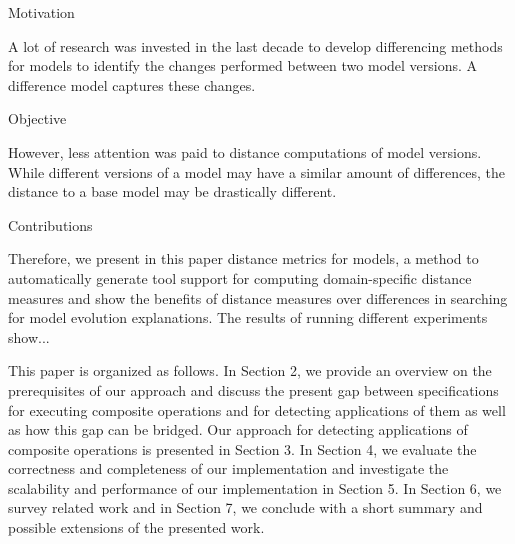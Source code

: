  
Motivation

A lot of research was invested in the last decade to develop differencing methods for models to identify the changes performed between two model versions.
A difference model captures these changes.

Objective

However, less attention was paid to distance computations of model versions. While different versions of a model may have a similar amount of differences,
the distance to a base model may be drastically different. 

Contributions

Therefore, we present in this paper distance metrics for models, a method to automatically generate tool support for computing domain-specific distance measures and show the benefits of distance measures over differences in searching for model evolution explanations. The results of running different experiments show...


This paper is organized as follows. In Section 2, we provide an overview on the prerequisites of our approach and discuss the present gap between specifications for executing composite operations and for detecting applications of them as well as how this gap can be bridged. Our approach for detecting applications of composite operations is presented in Section 3. In Section 4, we evaluate the correctness and completeness of our implementation and investigate the scalability and performance of our implementation in Section 5. In Section 6, we survey related work and in Section 7, we conclude with a short summary and possible extensions of the presented work. 